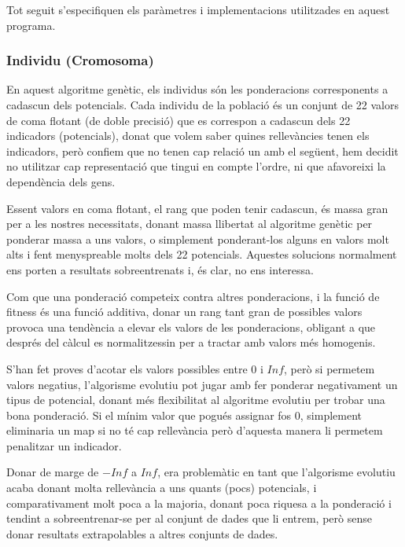 Tot seguit s'especifiquen els paràmetres i implementacions utilitzades en aquest
programa.

\subsubsection{Individu (Cromosoma)}
\label{ssub:individu (cromosoma)}

En aquest algoritme genètic, els individus són les ponderacions corresponents a
cadascun dels potencials.  Cada individu de la població és un conjunt de 22 valors de
coma flotant (de doble precisió) que es correspon a cadascun dels 22 indicadors
(potencials),  donat que volem saber quines rellevàncies tenen els indicadors, però
confiem que no tenen cap relació un amb el següent, hem decidit no utilitzar cap
representació que tingui en compte l'ordre, ni que afavoreixi la dependència
dels gens. %

Essent valors en coma flotant, el rang que poden tenir cadascun, és massa gran
per a les nostres necessitats, donant massa llibertat al algoritme genètic per
ponderar massa a uns valors, o simplement ponderant-los alguns en valors molt alts
i fent menyspreable molts dels 22 potencials.  Aquestes solucions normalment ens
porten a resultats sobreentrenats i, és clar, no ens interessa.

Com que una ponderació competeix contra altres ponderacions, i la funció de
fitness és una funció additiva, donar un rang tant gran de possibles valors
provoca una tendència a elevar els valors de les ponderacions, obligant a que
després del càlcul es normalitzessin per a tractar amb valors més homogenis.

S'han fet proves d'acotar els valors possibles entre 0 i $Inf$, però si
permetem valors negatius, l'algorisme evolutiu pot jugar amb fer ponderar
negativament un tipus de potencial, donant més flexibilitat al algoritme
evolutiu per trobar una bona ponderació.  Si el mínim valor que pogués assignar
fos 0, simplement eliminaria un map si no té cap rellevància però d'aquesta
manera li permetem penalitzar un indicador.

Donar de marge de $-Inf$ a $Inf$, era problemàtic en tant que l'algorisme
evolutiu acaba donant molta rellevància a uns quants (pocs) potencials, i
comparativament molt poca a la majoria, donant poca riquesa a la ponderació i
tendint a sobreentrenar-se per al conjunt de dades que li entrem, però sense
donar resultats extrapolables a altres conjunts de dades.

